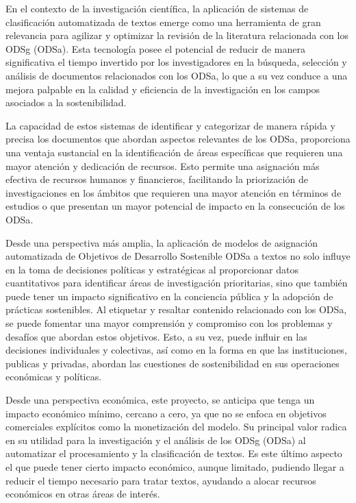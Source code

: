 En el contexto de la investigación científica, la aplicación de sistemas de
clasificación automatizada de textos emerge como una herramienta de gran
relevancia para agilizar y optimizar la revisión de la literatura relacionada
con los \gls{ODSg} (\gls{ODSa}). Esta tecnología posee el
potencial de reducir de manera significativa el tiempo invertido por los
investigadores en la búsqueda, selección y análisis de documentos relacionados
con los \gls{ODSa}, lo que a su vez conduce a una mejora palpable en la calidad y
eficiencia de la investigación en los campos asociados a la sostenibilidad.

La capacidad de estos sistemas de identificar y categorizar de manera rápida y
precisa los documentos que abordan aspectos relevantes de los \gls{ODSa}, proporciona
una ventaja sustancial en la identificación de áreas específicas que requieren
una mayor atención y dedicación de recursos. Esto permite una asignación más
efectiva de recursos humanos y financieros, facilitando la priorización de
investigaciones en los ámbitos que requieren una mayor atención en términos de
estudios o que presentan un mayor potencial de impacto en la consecución de los
\gls{ODSa}.

Desde una perspectiva más amplia, la aplicación de modelos de asignación
automatizada de Objetivos de Desarrollo Sostenible \gls{ODSa} a textos no solo
influye en la toma de decisiones políticas y estratégicas al proporcionar datos
cuantitativos para identificar áreas de investigación prioritarias, sino que
también puede tener un impacto significativo en la conciencia pública y la
adopción de prácticas sostenibles. Al etiquetar y resaltar contenido relacionado
con los \gls{ODSa}, se puede fomentar una mayor comprensión y compromiso con los
problemas y desafíos que abordan estos objetivos. Esto, a su vez, puede influir
en las decisiones individuales y colectivas, así como en la forma en que las
instituciones, publicas y privadas, abordan las cuestiones de sostenibilidad en
sus operaciones económicas y políticas.

Desde una perspectiva económica, este proyecto, se anticipa que tenga un impacto
económico mínimo, cercano a cero, ya que no se enfoca en objetivos comerciales
explícitos como la monetización del modelo. Su principal valor radica en su
utilidad para la investigación y el análisis de los \gls{ODSg} (\gls{ODSa}) al automatizar el procesamiento y la clasificación de textos.
Es este último aspecto el que puede tener cierto impacto económico, aunque
limitado, pudiendo llegar a reducir el tiempo necesario para tratar textos,
ayudando a alocar recursos económicos en otras áreas de interés.  

